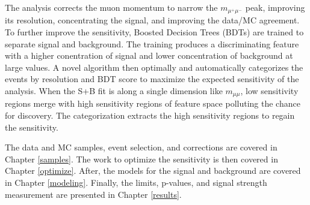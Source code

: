 The analysis corrects the muon momentum to narrow the $m_{\mu^+\mu^-}$ peak, improving its resolution, concentrating the signal, and improving the data/MC agreement. To further improve the sensitivity, Boosted Decision Trees (BDTs) \cite{bdt} are trained to separate signal and background. The training produces a discriminating feature with a higher conentration of signal and lower concentration of background at large values. A novel algorithm then optimally and automatically categorizes the events by resolution and BDT score to maximize the expected sensitivity of the analysis. When the S+B fit is along a single dimension like $m_{\mu\mu}$, low sensitivity regions merge with high sensitivity regions of feature space polluting the chance for discovery. The categorization extracts the high sensitivity regions to regain the sensitivity. 

The data and MC samples, event selection, and corrections are covered in Chapter \ref{samples}. The work to optimize the sensitivity is then covered in Chapter \ref{optimize}. After, the models for the signal and background are covered in Chapter \ref{modeling}. Finally, the limits, p-values, and signal strength measurement are presented in Chapter \ref{results}.
